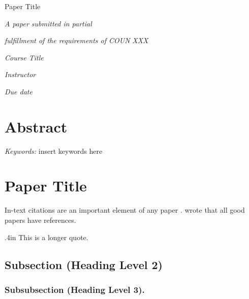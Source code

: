 \documentclass[12pt]{article}
\author{Author}
\title{\papertitle}
\newcommand{\papertitle}{Paper Title}
\newcommand{\coursenumber}{XXX}
\newcommand{\coursetitle}{Course Title}
\newcommand{\instructor}{Instructor}
\newcommand{\duedate}{Due date}
\newcommand{\indentamount}{.4in}
\renewcommand{\maketitle}{
  \begin{center}
    \vspace*{150pt}

    \begin{singlespace}
      \papertitle

      \theauthor
    \end{singlespace}

    \vspace{50pt}

    \textit{A paper submitted in partial}

    \textit{fulfillment of the requirements of COUN}
    \textit{\coursenumber}

    \textit{\coursetitle}

    \textit{\instructor}

    \textit{\duedate}
  \end{center}
}
\newenvironment{longquote}{\begin{adjustwidth}{\indentamount}{}}{\end{adjustwidth}}
\begin{document}

\maketitle

\newpage



\section{Abstract}

\setlength{\parindent}{0pt}

\lipsum[6]

\setlength{\parindent}{\indentamount}

\textit{Keywords:} insert keywords here

\newpage



\section{\papertitle}

In-text citations are an important element of any paper \parencite[42–43]{test_1}.
\textcite{test_2} wrote that all good papers have references.

\begin{longquote}
This is a longer quote. \lipsum[2] \parencite{test_1}
\end{longquote}

\subsection{Subsection (Heading Level 2)}

\lipsum[5]

\subsubsection{Subsubsection (Heading Level 3).}

\lipsum[5]



\newpage

\printbibliography
\end{document}
